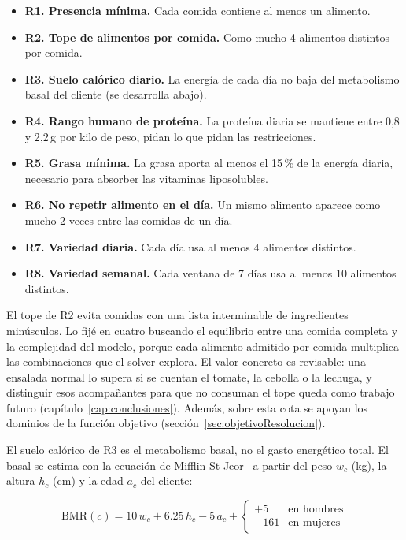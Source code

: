 \begin{itemize}
    \item \textbf{R1. Presencia mínima.} Cada comida contiene al menos un alimento.
    \item \textbf{R2. Tope de alimentos por comida.} Como mucho 4 alimentos distintos por comida.
    \item \textbf{R3. Suelo calórico diario.} La energía de cada día no baja del metabolismo basal del cliente (se desarrolla abajo).
    \item \textbf{R4. Rango humano de proteína.} La proteína diaria se mantiene entre 0,8 y 2,2\,g por kilo de peso, pidan lo que pidan las restricciones.
    \item \textbf{R5. Grasa mínima.} La grasa aporta al menos el 15\,\% de la energía diaria, necesario para absorber las vitaminas liposolubles.
    \item \textbf{R6. No repetir alimento en el día.} Un mismo alimento aparece como mucho 2 veces entre las comidas de un día.
    \item \textbf{R7. Variedad diaria.} Cada día usa al menos 4 alimentos distintos.
    \item \textbf{R8. Variedad semanal.} Cada ventana de 7 días usa al menos 10 alimentos distintos.
\end{itemize}

El tope de R2 evita comidas con una lista interminable de ingredientes minúsculos. Lo fijé en cuatro buscando el equilibrio entre una comida completa y la complejidad del modelo, porque cada alimento admitido por comida multiplica las combinaciones que el solver explora. El valor concreto es revisable: una ensalada normal lo supera si se cuentan el tomate, la cebolla o la lechuga, y distinguir esos acompañantes para que no consuman el tope queda como trabajo futuro (capítulo~\ref{cap:conclusiones}). Además, sobre esta cota se apoyan los dominios de la función objetivo (sección~\ref{sec:objetivoResolucion}).

El suelo calórico de R3 es el metabolismo basal, no el gasto energético total. El basal se estima con la ecuación de Mifflin-St Jeor~\citep{mifflin1990} a partir del peso $w_c$ (kg), la altura $h_c$ (cm) y la edad $a_c$ del cliente:

\begin{equation*}
\text{BMR}(c) = 10\,w_c + 6.25\,h_c - 5\,a_c +
\begin{cases}
+5 & \text{en hombres} \\
-161 & \text{en mujeres}
\end{cases}
\end{equation*}

